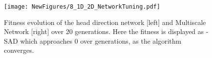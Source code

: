 \begin{figure}[t]
     \centering
     \texttt{[image: NewFigures/8\_1D\_2D\_NetworkTuning.pdf]}  
    \caption{Fitness evolution of the head direction network [left] and Multiscale Network [right] over 20 generations. Here the fitness is displayed as -SAD which approaches 0 over generations, as the algorithm converges.}
    \label{fig:5.3}
\end{figure}

%
%
%
%
%
%











